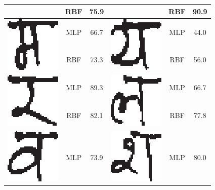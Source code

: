 \begin{table}[h]
\begin{tabular}{|c|c|c|c|c|c|}
\cline{2-3} \cline{5-6}
 & RBF & 75.9 &  & RBF & 90.9\tabularnewline
\hline
\multirow{2}{*}{\includegraphics[scale=0.25]{figures/datasets/nhcr/consonants/25ma}} & MLP & 66.7 & \multirow{2}{*}{\includegraphics[scale=0.25]{figures/datasets/nhcr/consonants/26ya}} & MLP & 44.0\tabularnewline
\cline{2-3} \cline{5-6}
 & RBF & 73.3 &  & RBF & 56.0\tabularnewline
\hline
\multirow{2}{*}{\includegraphics[scale=0.25]{figures/datasets/nhcr/consonants/27ra}} & MLP & 89.3 & \multirow{2}{*}{\includegraphics[scale=0.25]{figures/datasets/nhcr/consonants/28la}} & MLP & 66.7\tabularnewline
\cline{2-3} \cline{5-6}
 & RBF & 82.1 &  & RBF & 77.8\tabularnewline
\hline
\multirow{2}{*}{\includegraphics[scale=0.25]{figures/datasets/nhcr/consonants/29wa}} & MLP & 73.9 & \multirow{2}{*}{\includegraphics[scale=0.25]{figures/datasets/nhcr/consonants/30sa}} & MLP & 80.0\tabularnewline

\end{tabular}
\end{table}
